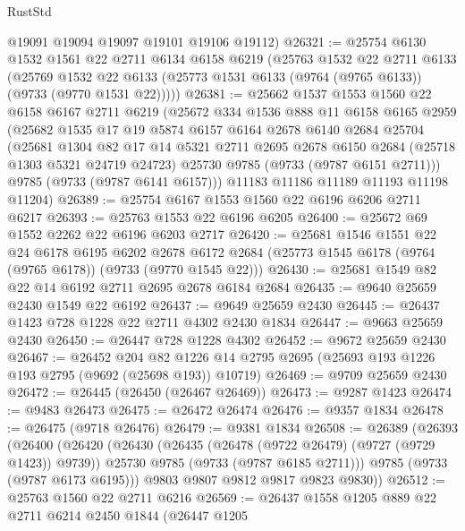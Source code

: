 \begin{lexlean}{RustStd}
\begin{coremodule}
{\begin{coremodule}
{{{{{{{{{{{{{{{{{{{{{{{{{{{{{{{{{{{{{{{{{{{{{{{{{{{{{{{      @19091
      @19094
      @19097
      @19101
      @19106
      @19112)
@26321 := @25754
    @6130
    @1532
    @1561
    @22
    @2711
    @6134
    @6158
    @6219
    (@25763
      @1532
      @22
      @2711
      @6133
      (@25769 @1532 @22 @6133 (@25773 @1531 @6133 (@9764 (@9765 @6133)) (@9733 (@9770 @1531 @22)))))
@26381 := @25662
    @1537
    @1553
    @1560
    @22
    @6158
    @6167
    @2711
    @6219
    (@25672
      @334
      @1536
      @888
      @11
      @6158
      @6165
      @2959
      (@25682
        @1535
        @17
        @19
        @5874
        @6157
        @6164
        @2678
        @6140
        @2684
        @25704
        (@25681
          @1304
          @82
          @17
          @14
          @5321
          @2711
          @2695
          @2678
          @6150
          @2684
          (@25718 @1303 @5321 @24719 @24723)
          @25730
          @9785
          (@9733 (@9787 @6151 @2711)))
        @9785
        (@9733 (@9787 @6141 @6157)))
      @11183
      @11186
      @11189
      @11193
      @11198
      @11204)
@26389 := @25754 @6167 @1553 @1560 @22 @6196 @6206 @2711 @6217
@26393 := @25763 @1553 @22 @6196 @6205
@26400 := @25672 @69 @1552 @2262 @22 @6196 @6203 @2717
@26420 := @25681
    @1546
    @1551
    @22
    @24
    @6178
    @6195
    @6202
    @2678
    @6172
    @2684
    (@25773 @1545 @6178 (@9764 (@9765 @6178)) (@9733 (@9770 @1545 @22)))
@26430 := @25681 @1549 @82 @22 @14 @6192 @2711 @2695 @2678 @6184 @2684
@26435 := @9640 @25659 @2430 @1549 @22 @6192
@26437 := @9649 @25659 @2430
@26445 := @26437 @1423 @728 @1228 @22 @2711 @4302 @2430 @1834
@26447 := @9663 @25659 @2430
@26450 := @26447 @728 @1228 @4302
@26452 := @9672 @25659 @2430
@26467 := @26452
    @204
    @82
    @1226
    @14
    @2795
    @2695
    (@25693 @193 @1226 @193 @2795 (@9692 (@25698 @193)) @10719)
@26469 := @9709 @25659 @2430
@26472 := @26445 (@26450 (@26467 @26469))
@26473 := @9287 @1423
@26474 := @9483 @26473
@26475 := @26472 @26474
@26476 := @9357 @1834
@26478 := @26475 (@9718 @26476)
@26479 := @9381 @1834
@26508 := @26389
    (@26393
      (@26400
        (@26420
          (@26430
            (@26435 (@26478 (@9722 @26479) (@9727 (@9729 @1423)) @9739))
            @25730
            @9785
            (@9733 (@9787 @6185 @2711)))
          @9785
          (@9733 (@9787 @6173 @6195)))
        @9803
        @9807
        @9812
        @9817
        @9823
        @9830))
@26512 := @25763 @1560 @22 @2711 @6216
@26569 := @26437
    @1558
    @1205
    @889
    @22
    @2711
    @6214
    @2450
    @1844
    (@26447
      @1205
}}}}}}}}}}}}}}}}}}}}}}}}}}}}}}}}}}}}}}}}}}}}}}}}}}}}}}}
\end{coremodule}}
\end{coremodule}
\end{lexlean}
